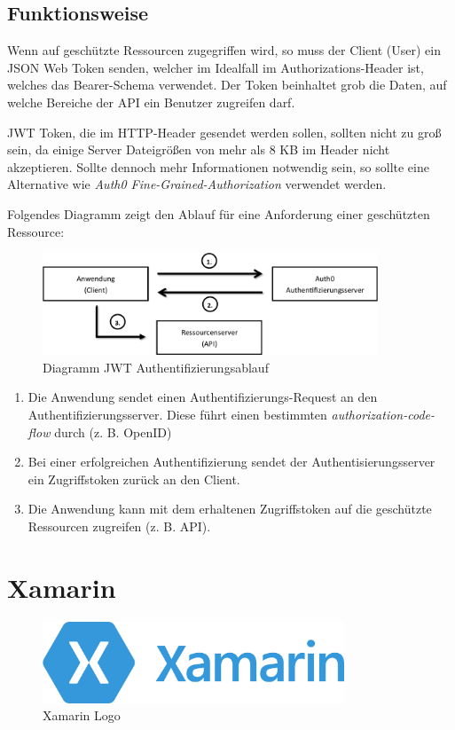 \subsection{Funktionsweise}
Wenn auf geschützte Ressourcen zugegriffen wird, so muss der Client (User) ein JSON Web Token senden, 
welcher im Idealfall im Authorizations-Header ist, welches das Bearer-Schema verwendet. 
Der Token beinhaltet grob die Daten, auf welche Bereiche der API ein Benutzer zugreifen darf. 

JWT Token, die im HTTP-Header gesendet werden sollen, sollten nicht zu groß sein, da einige Server Dateigrößen von mehr als 8 KB im Header nicht akzeptieren.
Sollte dennoch mehr Informationen notwendig sein, so sollte eine Alternative wie \textit{Auth0 Fine-Grained-Authorization} verwendet werden.

Folgendes Diagramm zeigt den Ablauf für eine Anforderung einer geschützten Ressource:

\begin{figure}[h]
    \begin{center}
        \includegraphics*[width=10cm]{./pics/Ablauf-JWT-Auth.png}
        \caption[Ablauf JWT Authentifizierung]{Diagramm JWT Authentifizierungsablauf}
    \end{center}
\end{figure}
    
\begin{enumerate}
    \item Die Anwendung sendet einen Authentifizierungs-Request an den Authentifizierungsserver. Diese führt einen bestimmten \textit{authorization-code-flow} durch (z. B. OpenID)
    \item Bei einer erfolgreichen Authentifizierung sendet der Authentisierungsserver ein Zugriffstoken zurück an den Client.
    \item Die Anwendung kann mit dem erhaltenen Zugriffstoken auf die geschützte Ressourcen zugreifen (z. B. API).
\end{enumerate}

\newpage
\section{Xamarin}
\cite{XML}
\begin{figure}[h]
    \begin{center}
        \includegraphics*[width=9cm]{pics/Xamarin_logo.png}
        \caption[Xamarin Logo]{Xamarin Logo \cite{XMLlogo}}
    \end{center}
\end{figure}
